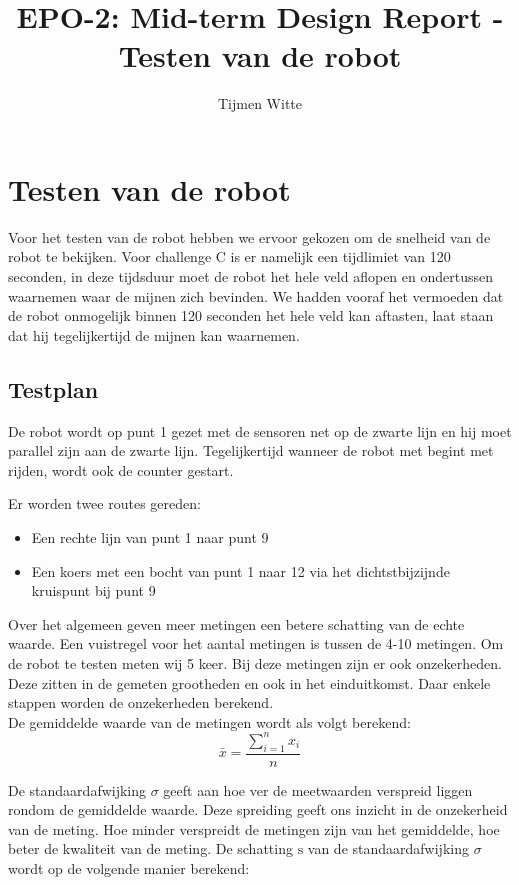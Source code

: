 \documentclass{report}
\title{EPO-2: Mid-term Design Report - Testen van de robot}
\author{Tijmen Witte}
\begin{document}
\chapter{Testen van de robot}
\label{ch:testen_robot}
Voor het testen van de robot hebben we ervoor gekozen om de snelheid van de robot te bekijken.
Voor challenge C is er namelijk een tijdlimiet van 120 seconden, in deze tijdsduur moet de robot het hele veld aflopen en ondertussen waarnemen waar de mijnen zich bevinden.
We hadden vooraf het vermoeden dat de robot onmogelijk binnen 120 seconden het hele veld kan aftasten, laat staan dat hij tegelijkertijd de mijnen kan waarnemen. 

\section{Testplan}
\label{sec:testplan}
De robot wordt op punt 1 gezet met de sensoren net op de zwarte lijn en hij moet parallel zijn aan de zwarte lijn. Tegelijkertijd wanneer de robot met begint met rijden, wordt ook de counter gestart. 

Er worden twee routes gereden:
\begin{itemize}
\item Een rechte lijn van punt 1 naar punt 9
\item Een koers met een bocht van punt 1 naar 12 via het dichtstbijzijnde kruispunt bij punt 9
\end{itemize}
Over het algemeen geven meer metingen een betere schatting van de echte waarde. Een vuistregel voor het aantal metingen is tussen de 4-10 metingen. Om de robot te testen meten wij 5 keer. 
Bij deze metingen zijn er ook onzekerheden. Deze zitten in de gemeten grootheden en ook in het einduitkomst. Daar enkele stappen worden de onzekerheden berekend.\\ 

De gemiddelde waarde van de metingen wordt als volgt berekend:
\begin{equation}
\label{gemidd}
\bar{x}=\frac{\sum_{i=1}^{n}x_i}{n}
\end{equation}

De standaardafwijking $\sigma$ geeft aan hoe ver de meetwaarden verspreid liggen rondom de gemiddelde waarde. Deze spreiding geeft ons inzicht in de onzekerheid van de meting. Hoe minder verspreidt de metingen zijn van het gemiddelde, hoe beter de kwaliteit van de meting. De schatting $\mathrm{s}$ van de standaardafwijking $\sigma$ wordt op de volgende manier berekend:
\end{document}
